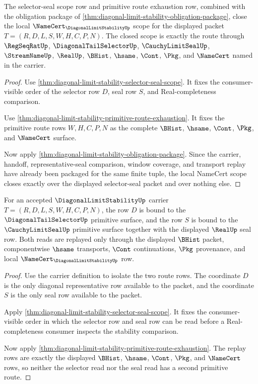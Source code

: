 \begin{theorem}
\label{thm:diagonal-limit-stability-namecert-scope-closure}
The selector-seal scope row and primitive route exhaustion row, combined with the obligation package of \autoref{thm:diagonal-limit-stability-obligation-package}, close the local $\NameCert_{\DiagonalLimitStabilityUp}$ scope for the displayed packet $T=(R,D,L,S,W,H,C,P,N)$. The closed scope is exactly the route through $\RegSeqRatUp$, $\DiagonalTailSelectorUp$, $\CauchyLimitSealUp$, $\StreamNameUp$, $\RealUp$, $\BHist$, $\hsame$, $\Cont$, $\Pkg$, and $\NameCert$ named in the carrier.
\end{theorem}
\begin{proof}
Use \autoref{thm:diagonal-limit-stability-selector-seal-scope}. It fixes the consumer-visible order of the selector row $D$, seal row $S$, and Real-completeness comparison.

Use \autoref{thm:diagonal-limit-stability-primitive-route-exhaustion}. It fixes the primitive route rows $W,H,C,P,N$ as the complete $\BHist$, $\hsame$, $\Cont$, $\Pkg$, and $\NameCert$ surface.

Now apply \autoref{thm:diagonal-limit-stability-obligation-package}. Since the carrier, handoff, representative-seal comparison, window coverage, and transport replay have already been packaged for the same finite tuple, the local NameCert scope closes exactly over the displayed selector-seal packet and over nothing else.
\end{proof}

\begin{theorem}
\label{thm:diagonal-limit-stability-selector-seal-primitive-binding}
For an accepted $\DiagonalLimitStabilityUp$ carrier $T=(R,D,L,S,W,H,C,P,N)$, the row $D$ is bound to the $\DiagonalTailSelectorUp$ primitive surface, and the row $S$ is bound to the $\CauchyLimitSealUp$ primitive surface together with the displayed $\RealUp$ seal row. Both reads are replayed only through the displayed $\BHist$ packet, componentwise $\hsame$ transports, $\Cont$ continuations, $\Pkg$ provenance, and local $\NameCert_{\DiagonalLimitStabilityUp}$ row.
\end{theorem}
\begin{proof}
Use the carrier definition to isolate the two route rows. The coordinate $D$ is the only diagonal representative row available to the packet, and the coordinate $S$ is the only seal row available to the packet.

Apply \autoref{thm:diagonal-limit-stability-selector-seal-scope}. It fixes the consumer-visible order in which the selector row and seal row can be read before a Real-completeness consumer inspects the stability comparison.

Now apply \autoref{thm:diagonal-limit-stability-primitive-route-exhaustion}. The replay rows are exactly the displayed $\BHist$, $\hsame$, $\Cont$, $\Pkg$, and $\NameCert$ rows, so neither the selector read nor the seal read has a second primitive route.
\end{proof}

